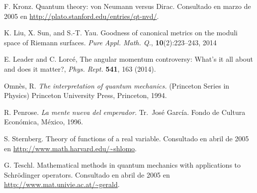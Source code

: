 \begin{thebibliography}{99}
 F. Kronz. Quantum theory: von {Neumann} versus {Dirac}. Consultado en marzo de 2005 en \url{http://plato.stanford.edu/entries/qt-nvd/}.

 K. Liu, X. Sun, and S.-T. Yau. Goodness of canonical metrics on the moduli space of Riemann surfaces. \textit{Pure Appl. Math. Q.}, \textbf{10}(2):223--243, 2014

 E. Leader and C. Lorcé, The angular momentum controversy: What's it all about and does it matter?, \textit{Phys. Rept.} \textbf{541}, 163 (2014).

 Omn\`{e}s, R. \textit{The interpretation of quantum mechanics.} (Princeton Series in Physics) Princeton University Press, Princeton, 1994.

 R. Penrose. \textit{La mente nueva del emperador.} Tr.~José García. Fondo de Cultura Económica, México, 1996.

 S. Sternberg. Theory of functions of a real variable. Consultado en abril de 2005 en \url{http://www.math.harvard.edu/\~shlomo}.

 G. Teschl. Mathematical methods in quantum mechanics with applications to {Schrödinger} operators. Consultado en abril de 2005 en \url{http://www.mat.univie.ac.at/\~gerald}.

\end{thebibliography}
